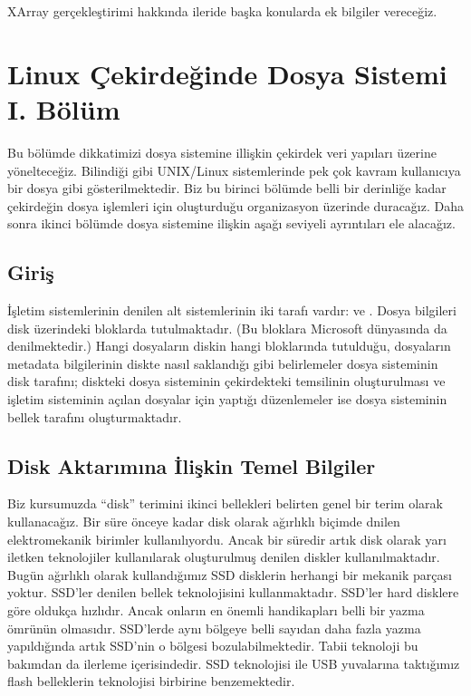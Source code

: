 \documentclass[a4paper,10pt,turkish]{sphinxmanual}
\begin{document}
\sphinxAtStartPar
XArray gerçekleştirimi hakkında ileride başka konularda ek bilgiler vereceğiz.

\sphinxstepscope


\chapter{Linux Çekirdeğinde Dosya Sistemi \sphinxhyphen{} I. Bölüm}
\label{\detokenize{filesystem1:linux-cekirdeginde-dosya-sistemi-i-bolum}}\label{\detokenize{filesystem1:dosya-sistemi-1}}\label{\detokenize{filesystem1::doc}}
\sphinxAtStartPar
Bu bölümde dikkatimizi dosya sistemine illişkin çekirdek veri yapıları üzerine yönelteceğiz. Bilindiği gibi
UNIX/Linux sistemlerinde pek çok kavram kullanıcıya bir dosya gibi gösterilmektedir. Biz bu birinci bölümde belli bir derinliğe
kadar çekirdeğin dosya işlemleri için oluşturduğu organizasyon üzerinde duracağız. Daha sonra ikinci bölümde
dosya sistemine ilişkin aşağı seviyeli ayrıntıları ele alacağız.


\section{Giriş}
\label{\detokenize{filesystem1:giris}}
\sphinxAtStartPar
İşletim sistemlerinin  denilen alt sistemlerinin iki tarafı vardır: 
ve  . Dosya bilgileri disk üzerindeki bloklarda tutulmaktadır. (Bu bloklara Microsoft dünyasında
 da denilmektedir.) Hangi dosyaların diskin hangi bloklarında tutulduğu, dosyaların
metadata bilgilerinin diskte nasıl saklandığı gibi belirlemeler dosya sisteminin disk tarafını;
diskteki dosya sisteminin çekirdekteki temsilinin oluşturulması ve işletim sisteminin açılan
dosyalar için yaptığı düzenlemeler ise dosya sisteminin bellek tarafını oluşturmaktadır.


\section{Disk Aktarımına İlişkin Temel Bilgiler}
\label{\detokenize{filesystem1:disk-aktarimina-iliskin-temel-bilgiler}}
\sphinxAtStartPar
Biz kursumuzda “disk” terimini ikinci bellekleri belirten genel bir terim olarak kullanacağız.
Bir süre önceye kadar disk olarak ağırlıklı biçimde  dnilen elektromekanik birimler
kullanılıyordu. Ancak bir süredir artık disk olarak yarı iletken teknolojiler kullanılarak oluşturulmuş
 denilen diskler kullanılmaktadır. Bugün ağırlıklı olarak kullandığımız SSD disklerin
herhangi bir mekanik parçası yoktur. SSD’ler  denilen bellek teknolojisini kullanmaktadır.
SSD’ler hard disklere göre oldukça hızlıdır. Ancak onların en önemli handikapları belli bir yazma ömrünün
olmasıdır. SSD’lerde aynı bölgeye belli sayıdan daha fazla yazma yapıldığında artık SSD’nin o bölgesi
bozulabilmektedir. Tabii teknoloji bu bakımdan da ilerleme içerisindedir. SSD teknolojisi ile USB yuvalarına
taktığımız flash belleklerin teknolojisi birbirine benzemektedir.
\end{document}
